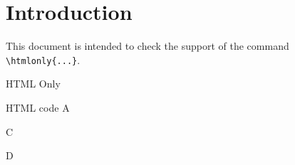 \documentclass{article}
\begin{document}
\section*{Introduction}

This document is intended to check the support of the command 
\verb|\htmlonly{...}|.

\begin{quiz}{HTML Only}

\begin{multi}{HTML code}
A  %
\item {}
\item C
\item* D
\end{multi}

\end{quiz}
\end{document}
